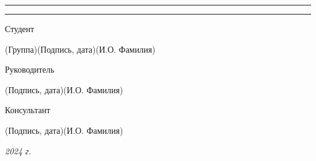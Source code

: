 \documentclass[14pt, russian]{scrartcl}
\begin{document}
\begin{titlepage}
\begin{center}
		\vspace*{-0.2ex}
		\rule{0.9\textwidth}{1.2pt}

		\vspace*{-0.2ex}
		\rule{0.9\textwidth}{1.2pt}
	\end{center}

	\vspace{\fill}


	\newlength{\ML}

	\noindent Студент \underline{} \hfill \underline{ \hspace{4cm}}\quad

	\vspace{-2.1ex}
	\noindent\hspace{9ex}\scriptsize{(Группа)}\normalsize\hspace{170pt}\hspace{2ex}\scriptsize{(Подпись, дата)}\normalsize\hspace{30pt}\hspace{6ex}\scriptsize{(И.О. Фамилия)}\normalsize

	\bigskip

	\noindent Руководитель  \hfill \underline{\hspace{4cm}}\quad

	\vspace{-2ex}
	\noindent\hspace{13.5ex}\normalsize\hspace{170pt}\hspace{2ex}\scriptsize{(Подпись, дата)}\normalsize\hspace{30pt}\hspace{6ex}\scriptsize{(И.О. Фамилия)}\normalsize

	\bigskip

	\noindent Консультант\hfill \underline{\hspace{4cm}}\quad
	\underline{\hspace{4cm}}

	\vspace{-2ex}
	\noindent\hspace{13.5ex}\normalsize\hspace{170pt}\hspace{2ex}\scriptsize{(Подпись, дата)}\normalsize\hspace{30pt}\hspace{6ex}\scriptsize{(И.О. Фамилия)}\normalsize
	\vfill




	\begin{center}
		\textsl{2024 г.}
	\end{center}
\end{titlepage}
\end{document}
